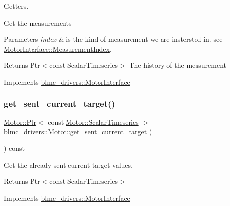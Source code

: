 Getters. 

Get the measurements


\begin{DoxyParams}{Parameters}
{\em index} & is the kind of measurement we are instersted in. see \hyperlink{classblmc__drivers_1_1MotorInterface_a35c1217dd295078c67bacc2cba08ab33}{Motor\+Interface\+::\+Measurement\+Index}. \\
\hline
\end{DoxyParams}
\begin{DoxyReturn}{Returns}
Ptr$<$const Scalar\+Timeseries$>$ The history of the measurement 
\end{DoxyReturn}


Implements \hyperlink{classblmc__drivers_1_1MotorInterface_a7f6afed670f078518ccb46e1e3b44892}{blmc\+\_\+drivers\+::\+Motor\+Interface}.

\mbox{\label{classblmc__drivers_1_1Motor_aed5e8ee5136b76a94fc17a4430b108c8}} 
\subsubsection{\texorpdfstring{get\+\_\+sent\+\_\+current\+\_\+target()}{get\_sent\_current\_target()}}
{\footnotesize\ttfamily \hyperlink{classblmc__drivers_1_1MotorInterface_ae31f230b9da3674a05543023c90b124c}{Motor\+::\+Ptr}$<$ const \hyperlink{classblmc__drivers_1_1MotorInterface_a49b8fc916b9f9debbd7b0988463db5cd}{Motor\+::\+Scalar\+Timeseries} $>$ blmc\+\_\+drivers\+::\+Motor\+::get\+\_\+sent\+\_\+current\+\_\+target (\begin{DoxyParamCaption}{ }\end{DoxyParamCaption}) const\hspace{0.3cm}{\ttfamily [virtual]}}



Get the already sent current target values. 

\begin{DoxyReturn}{Returns}
Ptr$<$const Scalar\+Timeseries$>$ 
\end{DoxyReturn}


Implements \hyperlink{classblmc__drivers_1_1MotorInterface_a709804e11aa22fbb3107e781c9799bdb}{blmc\+\_\+drivers\+::\+Motor\+Interface}.

